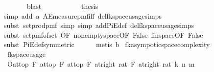 \begin{isabellebody}
\ \ \ \ \ \ \isamarkupfalse%
\ blast\isanewline
\ \ \isamarkupfalse%
\isanewline
\ \ \ \ \isanewline
\ \ \isamarkupfalse%
\ {\isacharquery}{\kern0pt}thesis\isanewline
\ \ \ \ \isamarkupfalse%
\ {\isacharparenleft}{\kern0pt}simp\ add{\isacharcolon}{\kern0pt}\ a\ AE{\isacharunderscore}{\kern0pt}measure{\isacharunderscore}{\kern0pt}pmf{\isacharunderscore}{\kern0pt}iff\ del{\isacharcolon}{\kern0pt}fk{\isacharunderscore}{\kern0pt}space{\isacharunderscore}{\kern0pt}usage{\isachardot}{\kern0pt}simps{\isacharparenright}{\kern0pt}\isanewline
\ \ \ \ \isamarkupfalse%
\ {\isacharparenleft}{\kern0pt}subst\ set{\isacharunderscore}{\kern0pt}prod{\isacharunderscore}{\kern0pt}pmf{\isacharcomma}{\kern0pt}\ simp{\isacharcomma}{\kern0pt}\ simp\ add{\isacharcolon}{\kern0pt}PiE{\isacharunderscore}{\kern0pt}def\ del{\isacharcolon}{\kern0pt}fk{\isacharunderscore}{\kern0pt}space{\isacharunderscore}{\kern0pt}usage{\isachardot}{\kern0pt}simps{\isacharparenright}{\kern0pt}\isanewline
\ \ \ \ \isamarkupfalse%
\ {\isacharparenleft}{\kern0pt}subst\ set{\isacharunderscore}{\kern0pt}pmf{\isacharunderscore}{\kern0pt}of{\isacharunderscore}{\kern0pt}set\ {\isacharbrackleft}{\kern0pt}OF\ non{\isacharunderscore}{\kern0pt}empty{\isacharunderscore}{\kern0pt}space{\isacharbrackleft}{\kern0pt}OF\ False{\isacharbrackright}{\kern0pt}\ fin{\isacharunderscore}{\kern0pt}space{\isacharbrackleft}{\kern0pt}OF\ False{\isacharbrackright}{\kern0pt}{\isacharbrackright}{\kern0pt}{\isacharparenright}{\kern0pt}\isanewline
\ \ \ \ \isamarkupfalse%
\ {\isacharparenleft}{\kern0pt}subst\ PiE{\isacharunderscore}{\kern0pt}def{\isacharbrackleft}{\kern0pt}symmetric{\isacharbrackright}{\kern0pt}{\isacharparenright}{\kern0pt}\isanewline
\ \ \ \ \isamarkupfalse%
\ {\isacharparenleft}{\kern0pt}metis\ b{\isacharparenright}{\kern0pt}\isanewline
{}\isamarkupfalse%
%
\endisatagproof
{\isafoldproof}%
%
\isadelimproof
\isanewline
%
\endisadelimproof
\isanewline
{}\isamarkupfalse%
\ fk{\isacharunderscore}{\kern0pt}asympotic{\isacharunderscore}{\kern0pt}space{\isacharunderscore}{\kern0pt}complexity{\isacharcolon}{\kern0pt}\isanewline
\ \ {\isachardoublequoteopen}fk{\isacharunderscore}{\kern0pt}space{\isacharunderscore}{\kern0pt}usage\ {\isasymin}\ \isanewline
\ \ O{\isacharbrackleft}{\kern0pt}at{\isacharunderscore}{\kern0pt}top\ {\isasymtimes}\isactrlsub F\ at{\isacharunderscore}{\kern0pt}top\ {\isasymtimes}\isactrlsub F\ at{\isacharunderscore}{\kern0pt}top\ {\isasymtimes}\isactrlsub F\ at{\isacharunderscore}{\kern0pt}right\ {\isacharparenleft}{\kern0pt}{}{\isacharcolon}{\kern0pt}{\isacharcolon}{\kern0pt}rat{\isacharparenright}{\kern0pt}\ {\isasymtimes}\isactrlsub F\ at{\isacharunderscore}{\kern0pt}right\ {\isacharparenleft}{\kern0pt}{}{\isacharcolon}{\kern0pt}{\isacharcolon}{\kern0pt}rat{\isacharparenright}{\kern0pt}{\isacharbrackright}{\kern0pt}{\isacharparenleft}{\kern0pt}{\isasymlambda}\ {\isacharparenleft}{\kern0pt}k{\isacharcomma}{\kern0pt}\ n{\isacharcomma}{\kern0pt}\ m{\isacharcomma}{\kern0pt}\ {\isasymepsilon}{\isacharcomma}{\kern0pt}\ {\isasymdelta}{\isacharparenright}{\kern0pt}{\isachardot}{\kern0pt}\isanewline

\end{isabellebody}
